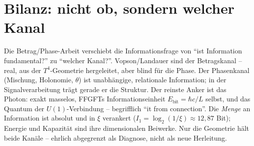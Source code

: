 \section{Bilanz: nicht ob, sondern welcher Kanal}
Die Betrag/Phase-Arbeit verschiebt die Informationsfrage von \enquote{ist Information fundamental?} zu
\enquote{welcher Kanal?}. Vopson/Landauer sind der Betragskanal -- real, aus der $T^4$-Geometrie
hergeleitet, aber blind für die Phase. Der Phasenkanal (Mischung, Holonomie, $\theta$) ist unabhängige,
relationale Information; in der Signalverarbeitung trägt gerade er die Struktur. Der reinste Anker ist das
Photon: exakt masselos, FFGFTs Informationseinheit $E_\text{bit}=\hbar c/L$ selbst, und das Quantum der
$U(1)$-Verbindung -- begrifflich \enquote{it from connection}. Die \emph{Menge} an Information ist
absolut und in $\xi$ verankert ($I_1=\log_2(1/\xi)\approx12{,}87$ Bit); Energie und Kapazität sind ihre
dimensionalen Beiwerke. Nur die Geometrie hält beide Kanäle -- ehrlich abgegrenzt als Diagnose, nicht als
neue Herleitung.

